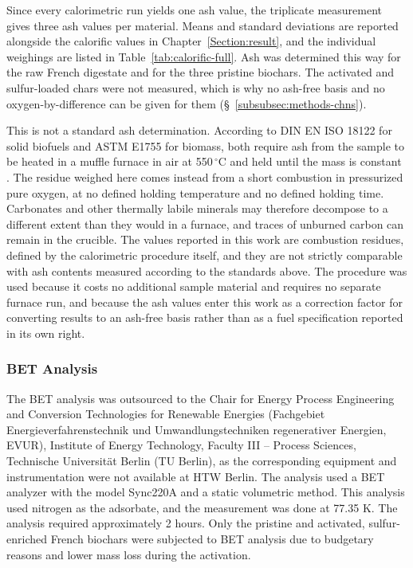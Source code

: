 Since every calorimetric run yields one ash value, the triplicate measurement gives three ash
values per material. Means and standard deviations are reported alongside the calorific values
in Chapter~\ref{Section:result}, and the individual weighings are listed in
Table~\ref{tab:calorific-full}. Ash was determined this way for the raw French digestate and for
the three pristine biochars. The activated and sulfur-loaded chars were not measured, which is
why no ash-free basis and no oxygen-by-difference can be given for them
(\S~\ref{subsubsec:methods-chns}).

\vspace{0.3em}

This is not a standard ash determination. According to DIN EN ISO 18122 for solid biofuels and ASTM E1755 for biomass, both require ash from the sample to be heated in a muffle furnace in air at 550\,$^{\circ}$C and held until the mass is  constant \parencite{iso18122_2022, astm_e1755_2020}. The residue weighed here comes instead from a short  combustion in pressurized pure oxygen, at no defined holding temperature and no defined holding time. Carbonates and other thermally labile minerals may therefore decompose to a different extent than they would in a furnace, and traces of unburned carbon can remain in the crucible. The values reported in this work are combustion residues, defined by the calorimetric procedure itself, and they are not strictly comparable with ash contents measured according to the standards above. The procedure was used because it costs no additional sample material and requires no separate furnace run, and because the ash values enter this work as a correction factor for converting results to an ash-free basis \parencite{iso16993_2016} rather than as a fuel specification reported in its own right.

\subsubsection{BET Analysis}

The BET analysis was outsourced to the Chair for Energy Process Engineering and Conversion Technologies for Renewable Energies (Fachgebiet Energieverfahrenstechnik und Umwandlungstechniken regenerativer Energien, EVUR), Institute of Energy Technology, Faculty III -- Process Sciences, Technische Universität Berlin (TU Berlin), as the corresponding equipment and instrumentation were not available at HTW Berlin. The analysis used a BET analyzer with the model Sync220A and a static volumetric method. This analysis used nitrogen as the adsorbate, and the measurement was done at 77.35 K. The analysis required approximately 2 hours. Only the pristine and activated, sulfur-enriched French biochars were subjected to BET analysis due to budgetary reasons and lower mass loss during the activation.

